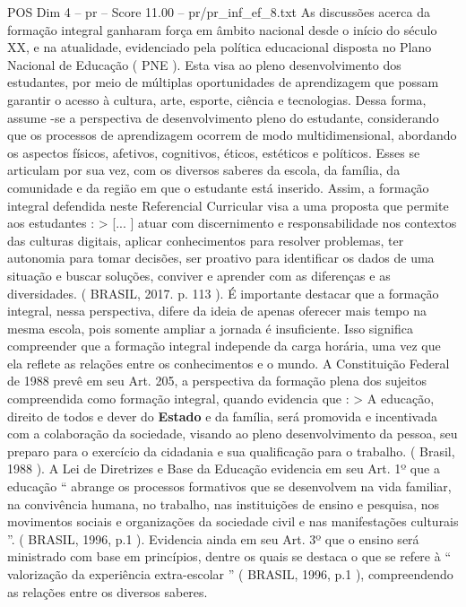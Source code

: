 \begin{textsample}{POS Dim 4 – pr – Score 11.00 – pr/pr\_inf\_ef\_8.txt}  \label{ex:f4_pos_187}
As discussões acerca da formação integral ganharam força em âmbito nacional desde o início do século XX, e na atualidade, evidenciado pela política educacional disposta no Plano Nacional de Educação ( PNE ).
Esta visa ao pleno desenvolvimento dos estudantes, por meio de múltiplas oportunidades de aprendizagem que possam garantir o acesso à cultura, arte, esporte, ciência e tecnologias.
Dessa forma, assume -se a perspectiva de desenvolvimento pleno do estudante, considerando que os processos de aprendizagem ocorrem de modo multidimensional, abordando os aspectos físicos, afetivos, cognitivos, éticos, estéticos e políticos.
Esses se articulam por sua vez, com os diversos saberes da escola, da família, da comunidade e da região em que o estudante está inserido.
Assim, a formação integral defendida neste Referencial Curricular visa a uma proposta que permite aos estudantes : > [... ] atuar com discernimento e responsabilidade nos contextos das culturas digitais, aplicar conhecimentos para resolver problemas, ter autonomia para tomar decisões, ser proativo para identificar os dados de uma situação e buscar soluções, conviver e aprender com as diferenças e as diversidades. ( BRASIL, 2017. p. 113 ).
É importante destacar que a formação integral, nessa perspectiva, difere da ideia de apenas oferecer mais tempo na mesma escola, pois somente ampliar a jornada é insuficiente.
Isso significa compreender que a formação integral independe da carga horária, uma vez que ela reflete as relações entre os conhecimentos e o mundo.
A Constituição Federal de 1988 prevê em seu Art. 205, a perspectiva da formação plena dos sujeitos compreendida como formação integral, quando evidencia que : > A educação, direito de todos e dever do \textbf{Estado} e da família, será promovida e incentivada com a colaboração da sociedade, visando ao pleno desenvolvimento da pessoa, seu preparo para o exercício da cidadania e sua qualificação para o trabalho. ( Brasil, 1988 ).
A Lei de Diretrizes e Base da Educação evidencia em seu Art. 1º que a educação “ abrange os processos formativos que se desenvolvem na vida familiar, na convivência humana, no trabalho, nas instituições de ensino e pesquisa, nos movimentos sociais e organizações da sociedade civil e nas manifestações culturais ”. ( BRASIL, 1996, p.1 ).
Evidencia ainda em seu Art. 3º que o ensino será ministrado com base em princípios, dentre os quais se destaca o que se refere à “ valorização da experiência extra-escolar ” ( BRASIL, 1996, p.1 ), compreendendo as relações entre os diversos saberes.

\end{textsample}

